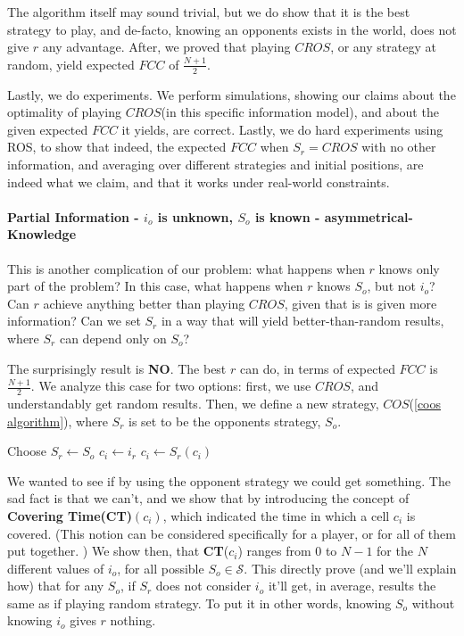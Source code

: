 \documentclass[a4paper,english,10pt]{article}
\newcommand\rob{\ensuremath{r}\xspace}
\newcommand\opp{\ensuremath{o}\xspace}
\newcommand{\fcc}{\ensuremath{FCC}\xspace}
\newcommand{\cros}{\ensuremath{CROS}\xspace}
\newcommand{\coos}{\ensuremath{COS}\xspace}
\begin{document}
The algorithm itself may sound trivial, but we do show that it is the best strategy to play, and de-facto, knowing an opponents exists in the world, does not give \rob any advantage. After, we proved that playing \cros, or any strategy at random, yield expected \fcc of $\frac{N+1}{2}$.

Lastly, we do experiments. We perform simulations, showing our claims about the optimality of playing \cros (in this specific information model), and about the given expected \fcc it yields, are correct. 
Lastly, we do hard experiments using ROS, to show that indeed, the expected \fcc when $S_\rob=\cros$ with no other information, and averaging over different strategies and initial positions, are indeed what we claim, and that it works under real-world constraints.

\paragraph{Partial Information - $i_\opp$ is unknown, $S_\opp$ is known - asymmetrical-Knowledge} 
This is another complication of our problem: what happens when \rob knows only part of the problem? In this case, what happens when \rob knows $S_\opp$, but not $i_\opp$? Can \rob achieve anything better than playing \cros, given that is is given more information? Can we set $S_\rob$ in a way that will yield better-than-random results, where $S_\rob$ can depend only on $S_\opp$?

The surprisingly result is \textbf{NO}. The best \rob can do, in terms of expected \fcc is $\frac{N+1}{2}$. 
We analyze this case for two options: first, we use \cros, and understandably get random results.
Then, we define a new strategy, \coos(\ref{coos algorithm}), where $S_\rob$ is set to be the opponents strategy, $S_\opp$. 
\begin{algorithm}
\begin{algorithmic}
	\STATE Choose $S_\rob \leftarrow S_\opp$
    \STATE $c_i \leftarrow i_\rob$
    \LOOP
    	\STATE $c_i \leftarrow S_\rob(c_i)$
    \ENDLOOP
  
\end{algorithmic}
\caption{\coos\label{coos algorithm}}
\end{algorithm}

We wanted to see if by using the opponent strategy we could get something. The sad fact is that we can't, and we show that by introducing the concept of \textbf{Covering Time(CT)}$(c_i)$, which indicated the time in which a cell $c_i$ is covered. (This notion can be considered specifically for a player, or for all of them put together. ) We show then, that \textbf{CT}($c_i$) ranges from $0$ to $N-1$ for the $N$ different values of $i_\opp$, for all possible $S_\opp \in \mathcal{S}$. This directly prove (and we'll explain how) that for any $S_\opp$, if $S_\rob$ does not consider $i_\opp$ it'll get, in average, results the same as if playing random strategy.
To put it in other words, knowing $S_\opp$ without knowing $i_\opp$ gives \rob nothing.
\end{document}
